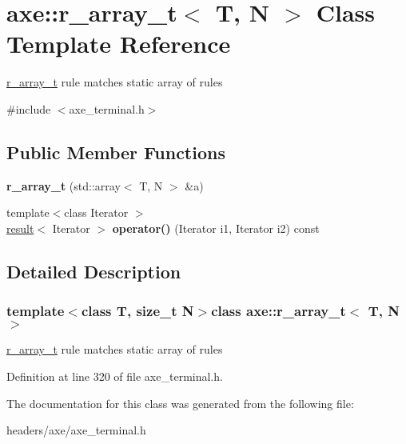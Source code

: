 \hypertarget{classaxe_1_1r__array__t}{\section{axe\+:\+:r\+\_\+array\+\_\+t$<$ T, N $>$ Class Template Reference}
\label{classaxe_1_1r__array__t}
}


\hyperlink{classaxe_1_1r__array__t}{r\+\_\+array\+\_\+t} rule matches static array of rules  




{\ttfamily \#include $<$axe\+\_\+terminal.\+h$>$}

\subsection*{Public Member Functions}
\begin{DoxyCompactItemize}
\item 
\hypertarget{classaxe_1_1r__array__t_ac99b0a8e528f0cb8b4e0677447b72f32}{{\bfseries r\+\_\+array\+\_\+t} (std\+::array$<$ T, N $>$ \&a)}\label{classaxe_1_1r__array__t_ac99b0a8e528f0cb8b4e0677447b72f32}

\item 
\hypertarget{classaxe_1_1r__array__t_afbbad3f96ace7d95451e48803b0b9206}{{\footnotesize template$<$class Iterator $>$ }\\\hyperlink{structaxe_1_1result}{result}$<$ Iterator $>$ {\bfseries operator()} (Iterator i1, Iterator i2) const }\label{classaxe_1_1r__array__t_afbbad3f96ace7d95451e48803b0b9206}

\end{DoxyCompactItemize}


\subsection{Detailed Description}
\subsubsection*{template$<$class T, size\+\_\+t N$>$class axe\+::r\+\_\+array\+\_\+t$<$ T, N $>$}

\hyperlink{classaxe_1_1r__array__t}{r\+\_\+array\+\_\+t} rule matches static array of rules 

Definition at line 320 of file axe\+\_\+terminal.\+h.



The documentation for this class was generated from the following file\+:\begin{DoxyCompactItemize}
\item 
headers/axe/axe\+\_\+terminal.\+h\end{DoxyCompactItemize}
